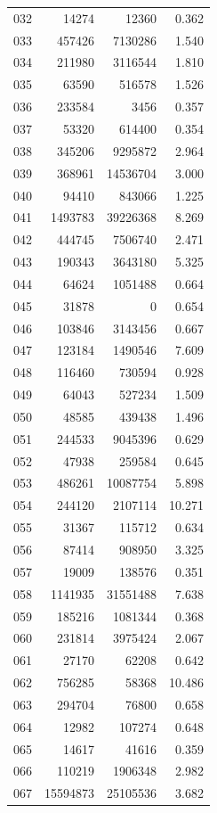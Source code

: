 \documentclass[anonymous,notoc]{gmcm2026}
\begin{document}
\begin{longtable}{lrrr}
032 & 14274 & 12360 & 0.362 \\
033 & 457426 & 7130286 & 1.540 \\
034 & 211980 & 3116544 & 1.810 \\
035 & 63590 & 516578 & 1.526 \\
036 & 233584 & 3456 & 0.357 \\
037 & 53320 & 614400 & 0.354 \\
038 & 345206 & 9295872 & 2.964 \\
039 & 368961 & 14536704 & 3.000 \\
040 & 94410 & 843066 & 1.225 \\
041 & 1493783 & 39226368 & 8.269 \\
042 & 444745 & 7506740 & 2.471 \\
043 & 190343 & 3643180 & 5.325 \\
044 & 64624 & 1051488 & 0.664 \\
045 & 31878 & 0 & 0.654 \\
046 & 103846 & 3143456 & 0.667 \\
047 & 123184 & 1490546 & 7.609 \\
048 & 116460 & 730594 & 0.928 \\
049 & 64043 & 527234 & 1.509 \\
050 & 48585 & 439438 & 1.496 \\
051 & 244533 & 9045396 & 0.629 \\
052 & 47938 & 259584 & 0.645 \\
053 & 486261 & 10087754 & 5.898 \\
054 & 244120 & 2107114 & 10.271 \\
055 & 31367 & 115712 & 0.634 \\
056 & 87414 & 908950 & 3.325 \\
057 & 19009 & 138576 & 0.351 \\
058 & 1141935 & 31551488 & 7.638 \\
059 & 185216 & 1081344 & 0.368 \\
060 & 231814 & 3975424 & 2.067 \\
061 & 27170 & 62208 & 0.642 \\
062 & 756285 & 58368 & 10.486 \\
063 & 294704 & 76800 & 0.658 \\
064 & 12982 & 107274 & 0.648 \\
065 & 14617 & 41616 & 0.359 \\
066 & 110219 & 1906348 & 2.982 \\
067 & 15594873 & 25105536 & 3.682 \\

\end{longtable}
\end{document}
